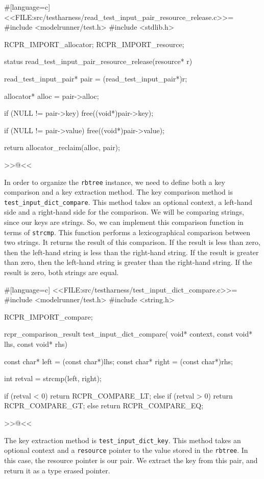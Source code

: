 {#[language=c]
<<FILE:src/testharness/read_test_input_pair_resource_release.c>>=
#include <modelrunner/test.h>
#include <stdlib.h>

RCPR_IMPORT_allocator;
RCPR_IMPORT_resource;

status read_test_input_pair_resource_release(resource* r)
{
    read_test_input_pair* pair = (read_test_input_pair*)r;

    allocator* alloc = pair->alloc;

    if (NULL != pair->key)
    {
        free((void*)pair->key);
    }

    if (NULL != pair->value)
    {
        free((void*)pair->value);
    }

    return allocator_reclaim(alloc, pair);
}
>>@<<

In order to organize the \verb/rbtree/ instance, we need to define both a key
comparison and a key extraction method. The key comparison method is
\verb/test_input_dict_compare/. This method takes an optional context, a
left-hand side and a right-hand side for the comparison. We will be comparing
strings, since our keys are strings. So, we can implement this comparison
function in terms of \verb/strcmp/. This function performs a lexicographical
comparison between two strings. It returns the result of this comparison. If the
result is less than zero, then the left-hand string is less than the right-hand
string.  If the result is greater than zero, then the left-hand string is
greater than the right-hand string. If the result is zero, both strings are
equal.

#[language=c]
<<FILE:src/testharness/test_input_dict_compare.c>>=
#include <modelrunner/test.h>
#include <string.h>

RCPR_IMPORT_compare;

rcpr_comparison_result test_input_dict_compare(
    void* context, const void* lhs, const void* rhs)
{
    const char* left = (const char*)lhs;
    const char* right = (const char*)rhs;

    int retval = strcmp(left, right);

    if (retval < 0)
        return RCPR_COMPARE_LT;
    else if (retval > 0)
        return RCPR_COMPARE_GT;
    else
        return RCPR_COMPARE_EQ;
}
>>@<<

The key extraction method is \verb/test_input_dict_key/. This method takes an
optional context and a \verb/resource/ pointer to the value stored in the
\verb/rbtree/.  In this case, the resource pointer is our pair.  We extract the
key from this pair, and return it as a type erased pointer.

}
